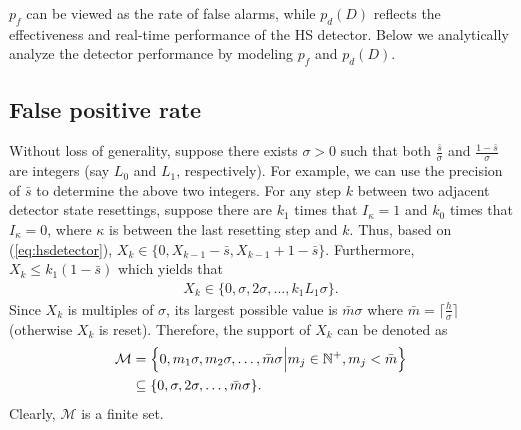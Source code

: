 \documentclass[conference]{IEEEtran}
\begin{document}
$p_f$ can be viewed as the rate of false alarms, while $p_d(D)$ reflects the effectiveness and real-time performance of the HS detector. Below we analytically analyze the detector performance by modeling $p_f$ and $p_d(D)$.

\subsection{False positive rate}
Without loss of generality, suppose there exists $\sigma>0$ such that both $\frac{\bar{s}}{\sigma}$ and $\frac{1-\bar{s}}{\sigma}$ are integers (say $L_0$ and $L_1$, respectively). For example, we can use the precision of $\bar{s}$ to determine the above two integers. For any step $k$ between two adjacent detector state resettings, suppose there are $k_1$ times that $I_{\kappa}=1$ and $k_0$ times that $I_{\kappa}=0$, where ${\kappa}$ is between the last resetting step and $k$. Thus, based on (\ref{eq:hsdetector}), $X_k\in\{0,X_{k-1}-\bar{s}, X_{k-1}+1-\bar{s}\}$. Furthermore, $X_k \leq k_1 (1-\bar{s})$ which yields that
\begin{align}
X_k \in \{0,\sigma,2\sigma,\ldots,k_1L_1\sigma\}.
\end{align}
Since $X_k$ is multiples of $\sigma$, its largest possible value is $\bar{m}\sigma$ where $\bar{m}=\lceil\frac{h}{\sigma}\rceil$ (otherwise $X_k$ is reset). Therefore, the support of $X_k$ can be denoted as
\begin{align}
\nonumber  \mathcal{M} =&\; \Bigl\{0,m_1\sigma,m_2\sigma,\ldots,\bar{m}\sigma
                            \Bigl|m_j\in\mathbb{N}^+,m_j< \bar{m}\Bigl\}\\
                    \subseteq&\; \{0,\sigma,2\sigma,\ldots,\bar{m}\sigma\}.
\end{align}
Clearly, $\mathcal{M}$ is a finite set.
\end{document}
